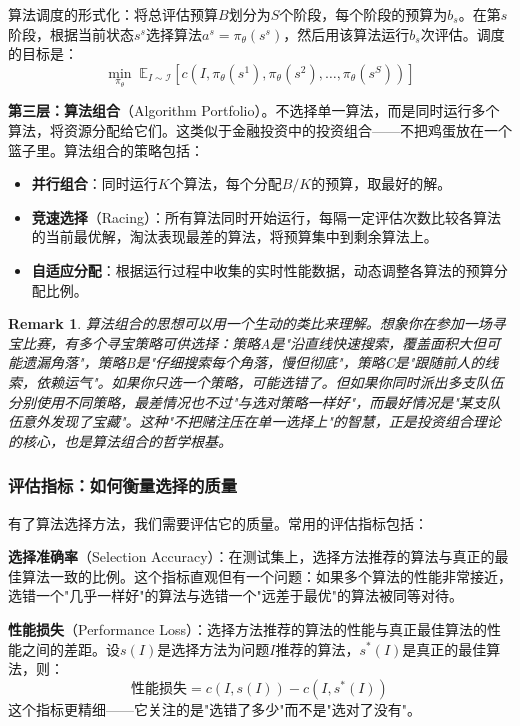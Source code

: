 \documentclass[lang=cn,zihao=-4,a4paper,fontset=windows]{beautybook}
\newtheorem*{remark}{\textbf{Remark}}
\begin{document}
算法调度的形式化：将总评估预算$B$划分为$S$个阶段，每个阶段的预算为$b_s$。在第$s$阶段，根据当前状态$s^s$选择算法$a^s = \pi_\theta(s^s)$，然后用该算法运行$b_s$次评估。调度的目标是：
\[
\min_{\pi_\theta} \; \mathbb{E}_{I \sim \mathcal{I}} \left[ c\left(I, \pi_\theta(s^1), \pi_\theta(s^2), \dots, \pi_\theta(s^S)\right) \right]
\]

\textbf{第三层：算法组合}（Algorithm Portfolio）。不选择单一算法，而是同时运行多个算法，将资源分配给它们。这类似于金融投资中的投资组合——不把鸡蛋放在一个篮子里。算法组合的策略包括：
\begin{itemize}
    \item \textbf{并行组合}：同时运行$K$个算法，每个分配$B/K$的预算，取最好的解。
    \item \textbf{竞速选择}（Racing）：所有算法同时开始运行，每隔一定评估次数比较各算法的当前最优解，淘汰表现最差的算法，将预算集中到剩余算法上。
    \item \textbf{自适应分配}：根据运行过程中收集的实时性能数据，动态调整各算法的预算分配比例。
\end{itemize}

\begin{remark}
算法组合的思想可以用一个生动的类比来理解。想象你在参加一场寻宝比赛，有多个寻宝策略可供选择：策略A是"沿直线快速搜索，覆盖面积大但可能遗漏角落"，策略B是"仔细搜索每个角落，慢但彻底"，策略C是"跟随前人的线索，依赖运气"。如果你只选一个策略，可能选错了。但如果你同时派出多支队伍分别使用不同策略，最差情况也不过"与选对策略一样好"，而最好情况是"某支队伍意外发现了宝藏"。这种"不把赌注压在单一选择上"的智慧，正是投资组合理论的核心，也是算法组合的哲学根基。
\end{remark}

\subsubsection{评估指标：如何衡量选择的质量}

有了算法选择方法，我们需要评估它的质量。常用的评估指标包括：

\textbf{选择准确率}（Selection Accuracy）：在测试集上，选择方法推荐的算法与真正的最佳算法一致的比例。这个指标直观但有一个问题：如果多个算法的性能非常接近，选错一个"几乎一样好"的算法与选错一个"远差于最优"的算法被同等对待。

\textbf{性能损失}（Performance Loss）：选择方法推荐的算法的性能与真正最佳算法的性能之间的差距。设$s(I)$是选择方法为问题$I$推荐的算法，$s^*(I)$是真正的最佳算法，则：
\[
\text{性能损失} = c(I, s(I)) - c(I, s^*(I))
\]
这个指标更精细——它关注的是"选错了多少"而不是"选对了没有"。
\end{document}
